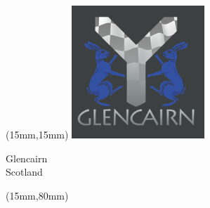 \begin{textblock*}{50mm}(15mm,15mm)%
\includegraphics[width=50mm]{LG/GLCN.png}
\par Glencairn\\ Scotland
\end{textblock*}
\begin{textblock*}{185mm}(15mm,80mm)%
\end{textblock*}
